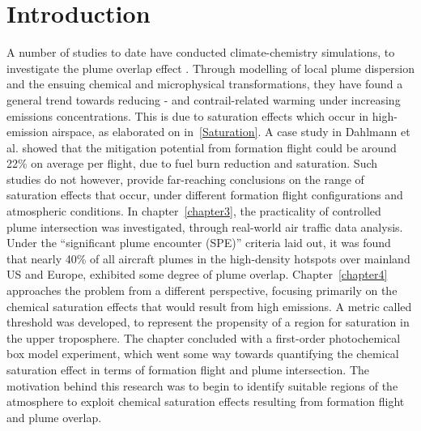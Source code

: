 \section{Introduction}
A number of studies to date have conducted climate-chemistry simulations, to investigate the plume overlap effect \cite{Kraabol2000b, Marks2020,Dahlmann2020}. Through modelling of local plume dispersion and the ensuing chemical and microphysical transformations, they have found a general trend towards reducing - and contrail-related warming under increasing emissions concentrations. This is due to saturation effects which occur in high-emission airspace, as elaborated on in~\ref{Saturation}. A case study in Dahlmann et al. \cite{Dahlmann2020} showed that the mitigation potential from formation flight could be around 22\% on average per flight, due to fuel burn reduction and  saturation. Such studies do not however, provide far-reaching conclusions on the range of saturation effects that occur, under different formation flight configurations and atmospheric conditions. In chapter~\ref{chapter3}, the practicality of controlled plume intersection was investigated, through real-world air traffic data analysis. Under the ``significant plume encounter (SPE)'' criteria laid out, it was found that nearly 40\% of all aircraft plumes in the high-density hotspots over mainland US and Europe, exhibited some degree of plume overlap. Chapter~\ref{chapter4} approaches the problem from a different perspective, focusing primarily on the chemical saturation effects that would result from high  emissions. A metric called  threshold was developed, to represent the propensity of a region for  saturation in the upper troposphere. The chapter concluded with a first-order photochemical box model experiment, which went some way towards quantifying the chemical saturation effect in terms of formation flight and plume intersection. The motivation behind this research was to begin to identify suitable regions of the atmosphere to exploit chemical saturation effects resulting from formation flight and plume overlap. 

